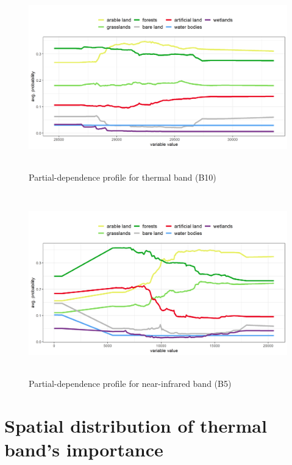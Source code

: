 \documentclass{amuthesis}
\begin{document}
\begin{figure}[H]

{\centering \includegraphics[width=5.625in,height=3.125in]{./figures/profB10.png}

}

\caption{\label{fig-rycina15}Partial-dependence profile for thermal band
(B10)}

\end{figure}

\begin{figure}[H]

{\centering \includegraphics[width=5.625in,height=3.125in]{./figures/profB5.png}

}

\caption{\label{fig-rycina16}Partial-dependence profile for
near-infrared band (B5)}

\end{figure}

\hypertarget{sec-imp-spat}{%
\section{Spatial distribution of thermal band's
importance}\label{sec-imp-spat}}
\end{document}
